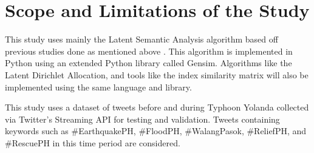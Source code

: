 \section{Scope and Limitations of the Study}

This study uses mainly the Latent Semantic Analysis algorithm based off previous studies done as mentioned above \cite{ROSALES2017, VELASCOBERMEJODOMINGO2018}. This algorithm is implemented in Python using an extended Python library called Gensim. Algorithms like the Latent Dirichlet Allocation, and tools like the index similarity matrix will also be implemented using the same language and library. 

This study uses a dataset of tweets before and during Typhoon Yolanda collected via Twitter's Streaming API for testing and validation. Tweets containing keywords such as \#EarthquakePH, \#FloodPH, \#WalangPasok, \#ReliefPH, and \#RescuePH in this time period are considered. 
